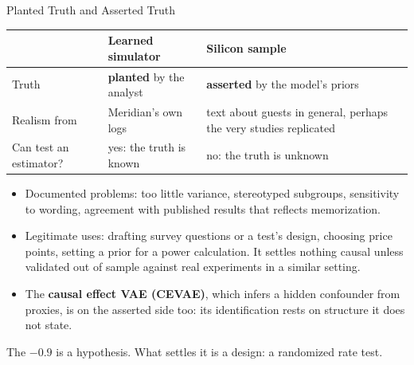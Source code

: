 \documentclass[aspectratio=169, 11pt, handout]{beamer}
\begin{document}
\begin{frame}{Planted Truth and Asserted Truth}

\begin{center}
\small
\begin{tabular}{p{2.6cm}p{5.0cm}p{5.0cm}}
\toprule
& \textbf{Learned simulator} & \textbf{Silicon sample} \\
\midrule
Truth & \textbf{planted} by the analyst & \textbf{asserted} by the model's priors \\
Realism from & Meridian's own logs & text about guests in general, perhaps the very studies replicated \\
Can test an estimator? & yes: the truth is known & no: the truth is unknown \\
\bottomrule
\end{tabular}
\end{center}

\medskip

\begin{itemize}
  \item Documented problems: too little variance, stereotyped subgroups, sensitivity to wording, agreement with published results that reflects memorization.
  \item Legitimate uses: drafting survey questions or a test's design, choosing price points, setting a prior for a power calculation. It settles nothing causal unless validated out of sample against real experiments in a similar setting.
  \item The \textbf{causal effect VAE (CEVAE)}, which infers a hidden confounder from proxies, is on the asserted side too: its identification rests on structure it does not state.
\end{itemize}

The $-0.9$ is a hypothesis. What settles it is a design: a randomized rate test.
\end{frame}
\end{document}
